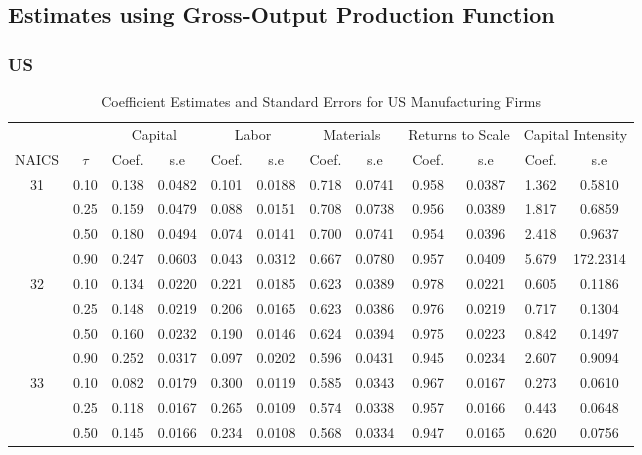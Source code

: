 \documentclass[11pt]{article}
\begin{document}
\subsection{Estimates using Gross-Output Production Function}

\subsubsection{US}

\begin{table}[H]
\centering
\caption{Coefficient Estimates and Standard Errors for US Manufacturing Firms}
\begin{tabular}{cccccccccccc}
  \hline\hline & & \multicolumn{2}{c}{Capital}  & \multicolumn{2}{c}{Labor} & \multicolumn{2}{c}{Materials} & \multicolumn{2}{c}{Returns to Scale} & \multicolumn{2}{c}{Capital Intensity}\\ \cmidrule(lr){3-4} \cmidrule(lr){5-6} \cmidrule(lr){7-8} \cmidrule(lr){9-10} \cmidrule(lr){11-12}NAICS & $\tau$ & Coef. & s.e & Coef. & s.e & Coef. & s.e & Coef. & s.e & Coef. & s.e \\ 
  \hline
31 & 0.10 & 0.138 & 0.0482 & 0.101 & 0.0188 & 0.718 & 0.0741 & 0.958 & 0.0387 & 1.362 & 0.5810 \\ 
   & 0.25 & 0.159 & 0.0479 & 0.088 & 0.0151 & 0.708 & 0.0738 & 0.956 & 0.0389 & 1.817 & 0.6859 \\ 
   & 0.50 & 0.180 & 0.0494 & 0.074 & 0.0141 & 0.700 & 0.0741 & 0.954 & 0.0396 & 2.418 & 0.9637 \\ 
   & 0.90 & 0.247 & 0.0603 & 0.043 & 0.0312 & 0.667 & 0.0780 & 0.957 & 0.0409 & 5.679 & 172.2314 \\ 
  32 & 0.10 & 0.134 & 0.0220 & 0.221 & 0.0185 & 0.623 & 0.0389 & 0.978 & 0.0221 & 0.605 & 0.1186 \\ 
   & 0.25 & 0.148 & 0.0219 & 0.206 & 0.0165 & 0.623 & 0.0386 & 0.976 & 0.0219 & 0.717 & 0.1304 \\ 
   & 0.50 & 0.160 & 0.0232 & 0.190 & 0.0146 & 0.624 & 0.0394 & 0.975 & 0.0223 & 0.842 & 0.1497 \\ 
   & 0.90 & 0.252 & 0.0317 & 0.097 & 0.0202 & 0.596 & 0.0431 & 0.945 & 0.0234 & 2.607 & 0.9094 \\ 
  33 & 0.10 & 0.082 & 0.0179 & 0.300 & 0.0119 & 0.585 & 0.0343 & 0.967 & 0.0167 & 0.273 & 0.0610 \\ 
   & 0.25 & 0.118 & 0.0167 & 0.265 & 0.0109 & 0.574 & 0.0338 & 0.957 & 0.0166 & 0.443 & 0.0648 \\ 
   & 0.50 & 0.145 & 0.0166 & 0.234 & 0.0108 & 0.568 & 0.0334 & 0.947 & 0.0165 & 0.620 & 0.0756 \\ 

\end{tabular}
\end{table}
\end{document}
